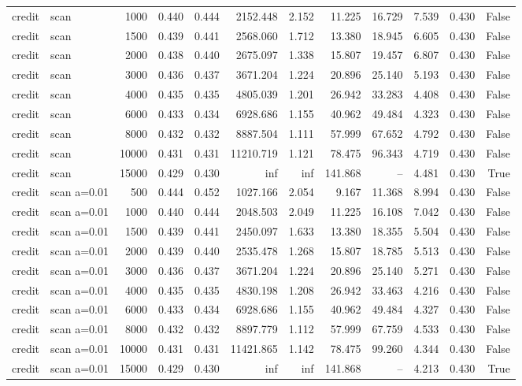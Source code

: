 \begin{tabular}{llrrrrrrrrrr}
credit & scan & 1000 & 0.440 & 0.444 & 2152.448 & 2.152 & 11.225 & 16.729 & 7.539 & 0.430 & False \\
credit & scan & 1500 & 0.439 & 0.441 & 2568.060 & 1.712 & 13.380 & 18.945 & 6.605 & 0.430 & False \\
credit & scan & 2000 & 0.438 & 0.440 & 2675.097 & 1.338 & 15.807 & 19.457 & 6.807 & 0.430 & False \\
credit & scan & 3000 & 0.436 & 0.437 & 3671.204 & 1.224 & 20.896 & 25.140 & 5.193 & 0.430 & False \\
credit & scan & 4000 & 0.435 & 0.435 & 4805.039 & 1.201 & 26.942 & 33.283 & 4.408 & 0.430 & False \\
credit & scan & 6000 & 0.433 & 0.434 & 6928.686 & 1.155 & 40.962 & 49.484 & 4.323 & 0.430 & False \\
credit & scan & 8000 & 0.432 & 0.432 & 8887.504 & 1.111 & 57.999 & 67.652 & 4.792 & 0.430 & False \\
credit & scan & 10000 & 0.431 & 0.431 & 11210.719 & 1.121 & 78.475 & 96.343 & 4.719 & 0.430 & False \\
credit & scan & 15000 & 0.429 & 0.430 & inf & inf & 141.868 & -- & 4.481 & 0.430 & True \\
credit & scan a=0.01 & 500 & 0.444 & 0.452 & 1027.166 & 2.054 & 9.167 & 11.368 & 8.994 & 0.430 & False \\
credit & scan a=0.01 & 1000 & 0.440 & 0.444 & 2048.503 & 2.049 & 11.225 & 16.108 & 7.042 & 0.430 & False \\
credit & scan a=0.01 & 1500 & 0.439 & 0.441 & 2450.097 & 1.633 & 13.380 & 18.355 & 5.504 & 0.430 & False \\
credit & scan a=0.01 & 2000 & 0.439 & 0.440 & 2535.478 & 1.268 & 15.807 & 18.785 & 5.513 & 0.430 & False \\
credit & scan a=0.01 & 3000 & 0.436 & 0.437 & 3671.204 & 1.224 & 20.896 & 25.140 & 5.271 & 0.430 & False \\
credit & scan a=0.01 & 4000 & 0.435 & 0.435 & 4830.198 & 1.208 & 26.942 & 33.463 & 4.216 & 0.430 & False \\
credit & scan a=0.01 & 6000 & 0.433 & 0.434 & 6928.686 & 1.155 & 40.962 & 49.484 & 4.327 & 0.430 & False \\
credit & scan a=0.01 & 8000 & 0.432 & 0.432 & 8897.779 & 1.112 & 57.999 & 67.759 & 4.533 & 0.430 & False \\
credit & scan a=0.01 & 10000 & 0.431 & 0.431 & 11421.865 & 1.142 & 78.475 & 99.260 & 4.344 & 0.430 & False \\
credit & scan a=0.01 & 15000 & 0.429 & 0.430 & inf & inf & 141.868 & -- & 4.213 & 0.430 & True \\

\end{tabular}
